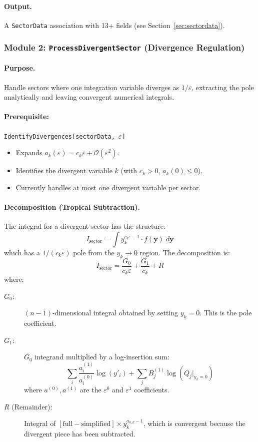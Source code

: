 \documentclass[11pt,a4paper]{article}
\begin{document}
\paragraph{Output.} A \texttt{SectorData} association with 13+ fields (see Section~\ref{sec:sectordata}).

\subsubsection{Module 2: \texttt{ProcessDivergentSector} (Divergence Regulation)}

\paragraph{Purpose.} Handle sectors where one integration variable diverges as $1/\varepsilon$, extracting the pole analytically and leaving convergent numerical integrals.

\paragraph{Prerequisite:} \texttt{IdentifyDivergences[sectorData, $\varepsilon$]}
\begin{itemize}
  \item Expands $a_k(\varepsilon) = c_k \varepsilon + \mathcal{O}(\varepsilon^2)$.
  \item Identifies the divergent variable $k$ (with $c_k > 0$, $a_k(0) \leq 0$).
  \item Currently handles at most one divergent variable per sector.
\end{itemize}

\paragraph{Decomposition (Tropical Subtraction).}
The integral for a divergent sector has the structure:
\begin{equation}
I_{\mathrm{sector}} = \int y_k^{c_k \varepsilon - 1} \cdot f(\mathbf{y}) \; d\mathbf{y}
\end{equation}
which has a $1/(c_k \varepsilon)$ pole from the $y_k \to 0$ region. The decomposition is:
\begin{equation}
I_{\mathrm{sector}} = \frac{G_0}{c_k \varepsilon} + \frac{G_1}{c_k} + R
\end{equation}
where:
\begin{description}
  \item[$G_0$:] $(n{-}1)$-dimensional integral obtained by setting $y_k = 0$. This is the pole coefficient.
  \item[$G_1$:] $G_0$ integrand multiplied by a log-insertion sum:
    \begin{equation}
    \sum_i \frac{a_i^{(1)}}{a_i^{(0)}} \log(y'_i) + \sum_j B_j^{(1)} \log(Q_j|_{y_k=0})
    \end{equation}
    where $a^{(0)}, a^{(1)}$ are the $\varepsilon^0$ and $\varepsilon^1$ coefficients.
  \item[$R$ (Remainder):] Integral of $[\text{full} - \text{simplified}] \times y_k^{a_{0,k}-1}$, which is convergent because the divergent piece has been subtracted.
\end{description}
\end{document}
